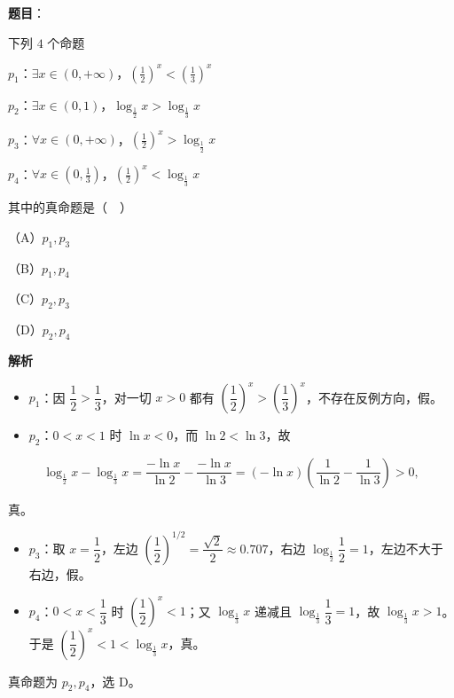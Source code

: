 \begin{answer}

\textbf{题目}：

下列 $4$ 个命题

$p_1$：$\exists x\in(0,+\infty)$，$\left(\frac12\right)^x<\left(\frac13\right)^x$

$p_2$：$\exists x\in(0,1)$，$\log_{\frac12}x>\log_{\frac13}x$

$p_3$：$\forall x\in(0,+\infty)$，$\left(\frac12\right)^x>\log_{\frac12}x$

$p_4$：$\forall x\in\left(0,\frac13\right)$，$\left(\frac12\right)^x<\log_{\frac13}x$

其中的真命题是（　）

（A）$p_1,p_3$

（B）$p_1,p_4$

（C）$p_2,p_3$

（D）$p_2,p_4$

\textbf{解析}

\begin{itemize}
\item $p_1$：因 $\dfrac12>\dfrac13$，对一切 $x>0$ 都有 $\left(\dfrac12\right)^x>\left(\dfrac13\right)^x$，不存在反例方向，假。
\item $p_2$：$0<x<1$ 时 $\ln x<0$，而 $\ln2<\ln3$，故
\end{itemize}

\nopagebreak[4]
\[\log_{\frac12}x-\log_{\frac13}x=\frac{-\ln x}{\ln2}-\frac{-\ln x}{\ln3}
=(-\ln x)\left(\frac1{\ln2}-\frac1{\ln3}\right)>0,\]

真。

\begin{itemize}
\item $p_3$：取 $x=\dfrac12$，左边 $\left(\dfrac12\right)^{1/2}=\dfrac{\sqrt2}{2}\approx0.707$，右边 $\log_{\frac12}\dfrac12=1$，左边不大于右边，假。
\item $p_4$：$0<x<\dfrac13$ 时 $\left(\dfrac12\right)^x<1$；又 $\log_{\frac13}x$ 递减且 $\log_{\frac13}\dfrac13=1$，故 $\log_{\frac13}x>1$。于是 $\left(\dfrac12\right)^x<1<\log_{\frac13}x$，真。
\end{itemize}

真命题为 $p_2,p_4$，选 D。


\end{answer}
